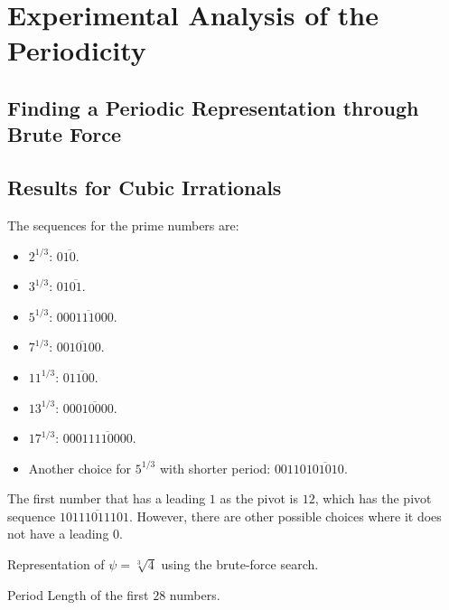 \chapter{Experimental Analysis of the Periodicity}

\section{Finding a Periodic Representation through Brute Force}

\section{Results for Cubic Irrationals}

\begin{example}
  The sequences for the prime numbers are:
  \begin{itemize}
    \item $2^{1/3}$: $0\overline{10}$.
    \item $3^{1/3}$: $01\overline{01}$.
    \item $5^{1/3}$: $0\overline{00111000}$.
    \item $7^{1/3}$: $0\overline{010100}$.
    \item $11^{1/3}$: $0\overline{1100}$.
    \item $13^{1/3}$: $00\overline{010000}$.
    \item $17^{1/3}$: $000\overline{11110000}$.
    \item Another choice for $5^{1/3}$ with shorter period: $00110\overline{101010}$.
  \end{itemize}
\end{example}

\begin{remark}
  The first number that has a leading $1$ as the pivot is $12$,
  which has the pivot sequence $1\overline{0111011101}$.
  However, there are other possible choices where it does not have a leading $0$.
\end{remark}

\begin{table}[t]
  \caption{Representation of $ψ = \sqrt[3]{4}$ using the brute-force search.}
  \label{table:cube-root-4}
  \centering
  
\end{table}

\begin{table}[t]
  \caption{Period Length of the first $28$ numbers.}
  \centering
  
\end{table}

